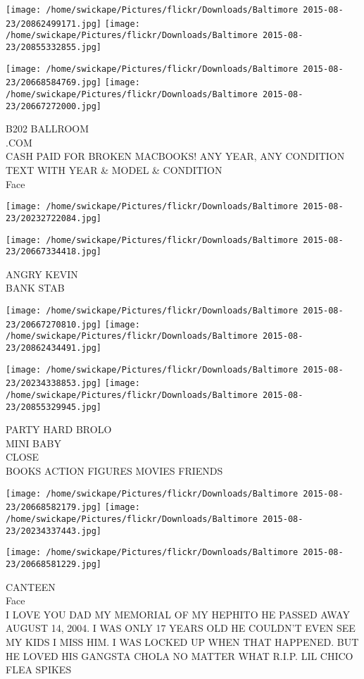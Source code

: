 \documentclass[10pt,letterpaper]{article}
\begin{document}
\texttt{[image: /home/swickape/Pictures/flickr/Downloads/Baltimore 2015-08-23/20862499171.jpg]}
\texttt{[image: /home/swickape/Pictures/flickr/Downloads/Baltimore 2015-08-23/20855332855.jpg]}

\texttt{[image: /home/swickape/Pictures/flickr/Downloads/Baltimore 2015-08-23/20668584769.jpg]}
\texttt{[image: /home/swickape/Pictures/flickr/Downloads/Baltimore 2015-08-23/20667272000.jpg]}

B202 BALLROOM\\
.COM\\
CASH PAID FOR BROKEN MACBOOKS!  ANY YEAR, ANY CONDITION TEXT WITH YEAR \& MODEL \& CONDITION\\
Face
\pagebreak

\texttt{[image: /home/swickape/Pictures/flickr/Downloads/Baltimore 2015-08-23/20232722084.jpg]}

\vspace{0.25in}
\texttt{[image: /home/swickape/Pictures/flickr/Downloads/Baltimore 2015-08-23/20667334418.jpg]}

ANGRY KEVIN\\
BANK STAB
\pagebreak

\texttt{[image: /home/swickape/Pictures/flickr/Downloads/Baltimore 2015-08-23/20667270810.jpg]}
\texttt{[image: /home/swickape/Pictures/flickr/Downloads/Baltimore 2015-08-23/20862434491.jpg]}

\texttt{[image: /home/swickape/Pictures/flickr/Downloads/Baltimore 2015-08-23/20234338853.jpg]}
\texttt{[image: /home/swickape/Pictures/flickr/Downloads/Baltimore 2015-08-23/20855329945.jpg]}

PARTY HARD BROLO\\
MINI BABY\\
CLOSE\\
BOOKS ACTION FIGURES MOVIES FRIENDS
\pagebreak

\texttt{[image: /home/swickape/Pictures/flickr/Downloads/Baltimore 2015-08-23/20668582179.jpg]}
\texttt{[image: /home/swickape/Pictures/flickr/Downloads/Baltimore 2015-08-23/20234337443.jpg]}

\vspace{0.25in}
\texttt{[image: /home/swickape/Pictures/flickr/Downloads/Baltimore 2015-08-23/20668581229.jpg]}

CANTEEN\\
Face\\
I LOVE YOU DAD MY MEMORIAL OF MY HEPHITO HE PASSED AWAY AUGUST 14, 2004.  I WAS ONLY 17 YEARS OLD HE COULDN'T EVEN SEE MY KIDS I MISS HIM.  I WAS LOCKED UP WHEN THAT HAPPENED.  BUT HE LOVED HIS GANGSTA CHOLA NO MATTER WHAT R.I.P. LIL CHICO FLEA SPIKES
\pagebreak
\end{document}
